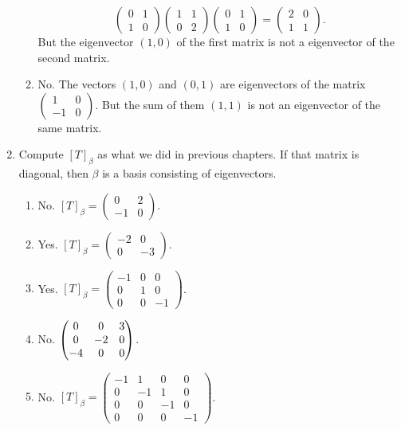 \begin{enumerate}
\begin{enumerate}
\[\begin{pmatrix}0&1\\1&0\end{pmatrix}\begin{pmatrix}1&1\\0&2\end{pmatrix}\begin{pmatrix}0&1\\1&0\end{pmatrix}=\begin{pmatrix}2&0\\1&1\end{pmatrix}.\]
But the eigenvector $(1,0)$ of the first matrix is not a eigenvector of the second matrix.
\item No. The vectors $(1,0)$ and $(0,1)$ are eigenvectors of the matrix $\begin{pmatrix}1&0\\-1&0\end{pmatrix}$. But the sum of them $(1,1)$ is not an eigenvector of the same matrix.
\end{enumerate}
\item Compute $[T]_{\beta}$ as what we did in previous chapters. If that matrix is diagonal, then $\beta $ is a basis consisting of eigenvectors.
\begin{enumerate}
\item No. $[T]_{\beta}=\begin{pmatrix}0&2\\-1&0\end{pmatrix}$.
\item Yes. $[T]_{\beta}=\begin{pmatrix}-2&0\\0&-3\end{pmatrix}$.
\item Yes. $[T]_{\beta}=\begin{pmatrix}-1&0&0\\0&1&0\\0&0&-1\end{pmatrix}$.
\item No. $\begin{pmatrix}0 & 0 & 3\cr 0 & -2 & 0\cr -4 & 0 & 0\end{pmatrix}$.
\item No. $[T]_{\beta}=\begin{pmatrix}-1&1&0&0\\0&-1&1&0\\0&0&-1&0\\0&0&0&-1\end{pmatrix}$.

\end{enumerate}
\end{enumerate}
